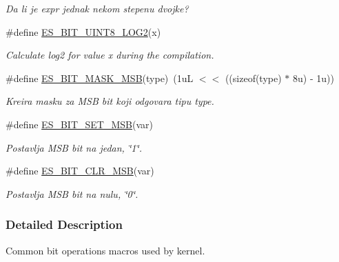 \begin{DoxyCompactItemize}
\begin{DoxyCompactList}\small\item\em Da li je {\ttfamily expr} jednak nekom stepenu dvojke? \end{DoxyCompactList}\item 
\#define \hyperlink{group__kern__bit__intf_gaac7d6ae35c69a48b51dcf41bfef4448e}{E\-S\-\_\-\-B\-I\-T\-\_\-\-U\-I\-N\-T8\-\_\-\-L\-O\-G2}(x)
\begin{DoxyCompactList}\small\item\em Calculate log2 for value {\ttfamily x} during the compilation. \end{DoxyCompactList}\item 
\#define \hyperlink{group__kern__bit__intf_ga99c10e53689b8faa16cf6e8e5d5d4627}{E\-S\-\_\-\-B\-I\-T\-\_\-\-M\-A\-S\-K\-\_\-\-M\-S\-B}(type)~(1u\-L $<$$<$ ((sizeof(type) $\ast$ 8u) -\/ 1u))
\begin{DoxyCompactList}\small\item\em Kreira masku za M\-S\-B bit koji odgovara tipu {\ttfamily type}. \end{DoxyCompactList}\item 
\#define \hyperlink{group__kern__bit__intf_ga6ba80e88a8a093ef86a50be3c527c525}{E\-S\-\_\-\-B\-I\-T\-\_\-\-S\-E\-T\-\_\-\-M\-S\-B}(var)
\begin{DoxyCompactList}\small\item\em Postavlja M\-S\-B bit na jedan, \char`\"{}1\char`\"{}. \end{DoxyCompactList}\item 
\#define \hyperlink{group__kern__bit__intf_ga1d3b2fa3215704398adf58917cf1667d}{E\-S\-\_\-\-B\-I\-T\-\_\-\-C\-L\-R\-\_\-\-M\-S\-B}(var)
\begin{DoxyCompactList}\small\item\em Postavlja M\-S\-B bit na nulu, \char`\"{}0\char`\"{}. \end{DoxyCompactList}\end{DoxyCompactItemize}


\subsubsection{Detailed Description}
Common bit operations macros used by kernel. 

